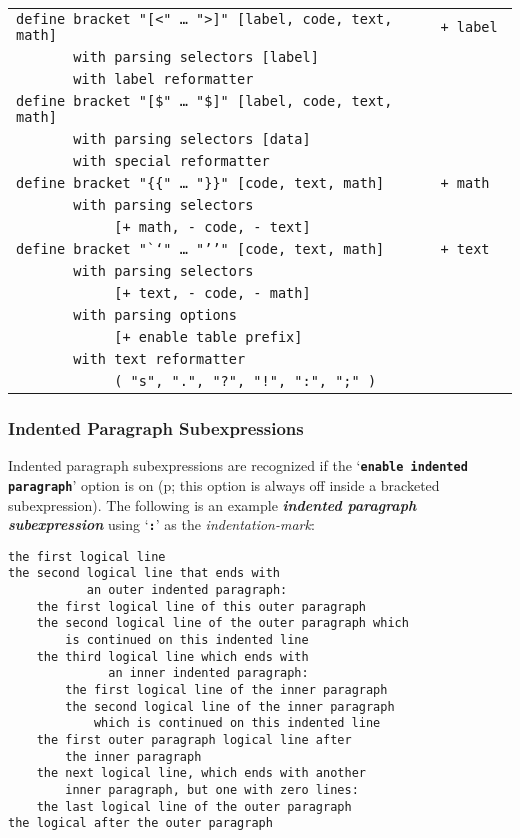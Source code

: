 \documentclass[12pt]{article}
\newcommand{\TT}[1]{{\tt \bfseries #1}}
\newcommand{\key}[1]{{\bf \em #1}\index{#1}}
\newcommand{\pagref}[1]{p\pageref{#1}}
\newenvironment{indpar}[1][0.3in]%
	{\begin{list}{}%
		     {\setlength{\itemsep}{0in}%
		      \setlength{\topsep}{0in}%
		      \setlength{\parsep}{1ex}%
		      \setlength{\labelwidth}{#1}%
		      \setlength{\leftmargin}{#1}%
		      \addtolength{\leftmargin}{\labelsep}}%
	 \item}%
	{\end{list}}
\begin{document}
\begin{center}
\begin{tabular}{l@{\hspace*{0.2in}}l}
\tt define bracket "[<" \ldots~">]" [label, code, text, math] & \tt + label \\
\tt ~~~~~~~with parsing selectors [label] \\
\tt ~~~~~~~with label reformatter \\
\tt define bracket "[\$" \ldots~"\$]" [label, code, text, math] \\
\tt ~~~~~~~with parsing selectors [data] \\
\tt ~~~~~~~with special reformatter \\
\tt define bracket "\{\{" \ldots~"\}\}" [code, text, math]   & \tt + math \\
\tt ~~~~~~~with parsing selectors \\
\tt ~~~~~~~~~~~~[+ math, - code, - text] \\
\tt define bracket "`{}`" \ldots~"'{}'" [code, text, math]   & \tt + text \\
\tt ~~~~~~~with parsing selectors \\
\tt ~~~~~~~~~~~~[+ text, - code, - math] \\
\tt ~~~~~~~with parsing options \\
\tt ~~~~~~~~~~~~[+ enable table prefix] \\
\tt ~~~~~~~with text reformatter \\
\tt ~~~~~~~~~~~~( "s", ".", "?", "!", ":", ";" ) \\
\end{tabular}
\end{center}

\subsubsection{Indented Paragraph Subexpressions}
\label{INDENTED-PARAGRAPH-SUBEXPRESSIONS}

Indented paragraph subexpressions
are recognized if the `\TT{enable indented paragraph}'
option is on (\pagref{ENABLE-INDENTED-PARAGRAPH}; this
option is always off inside a bracketed subexpression).
The following is an example
\key{indented paragraph subexpression}
using `\TT{:}' as the {\em indentation-mark}:
\begin{indpar}\begin{verbatim}
the first logical line
the second logical line that ends with
           an outer indented paragraph:
    the first logical line of this outer paragraph
    the second logical line of the outer paragraph which
        is continued on this indented line
    the third logical line which ends with
              an inner indented paragraph:
        the first logical line of the inner paragraph
        the second logical line of the inner paragraph
            which is continued on this indented line
    the first outer paragraph logical line after
        the inner paragraph
    the next logical line, which ends with another
        inner paragraph, but one with zero lines:
    the last logical line of the outer paragraph
the logical after the outer paragraph
\end{verbatim}\end{indpar}
\end{document}
